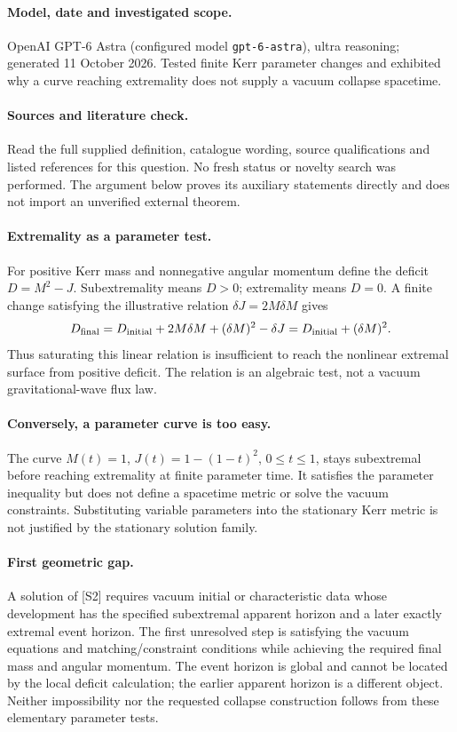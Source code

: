 \documentclass[11pt]{article}
\begin{document}
\paragraph{Model, date and investigated scope.}
OpenAI GPT-6 Astra (configured model \texttt{gpt-6-astra}), ultra reasoning; generated 11 October 2026. Tested finite Kerr parameter changes and exhibited why a curve reaching extremality does not supply a vacuum collapse spacetime.

\paragraph{Sources and literature check.}
Read the full supplied definition, catalogue wording, source qualifications and listed references for this question. No fresh status or novelty search was performed. The argument below proves its auxiliary statements directly and does not import an unverified external theorem.

\paragraph{Extremality as a parameter test.} For positive Kerr mass and nonnegative angular momentum define the deficit \(D=M^2-J\). Subextremality means \(D>0\); extremality means \(D=0\). A finite change satisfying the illustrative relation \(\delta J=2M\delta M\) gives
\[
 D_{\rm final}=D_{\rm initial}+2M\delta M+(\delta M)^2-\delta J
 =D_{\rm initial}+(\delta M)^2.
\]
Thus saturating this linear relation is insufficient to reach the nonlinear extremal surface from positive deficit. The relation is an algebraic test, not a vacuum gravitational-wave flux law.
\paragraph{Conversely, a parameter curve is too easy.} The curve \(M(t)=1\), \(J(t)=1-(1-t)^2\), \(0\leq t\leq1\), stays subextremal before reaching extremality at finite parameter time. It satisfies the parameter inequality but does not define a spacetime metric or solve the vacuum constraints. Substituting variable parameters into the stationary Kerr metric is not justified by the stationary solution family.
\paragraph{First geometric gap.} A solution of [S2] requires vacuum initial or characteristic data whose development has the specified subextremal apparent horizon and a later exactly extremal event horizon. The first unresolved step is satisfying the vacuum equations and matching/constraint conditions while achieving the required final mass and angular momentum. The event horizon is global and cannot be located by the local deficit calculation; the earlier apparent horizon is a different object. Neither impossibility nor the requested collapse construction follows from these elementary parameter tests.
\end{document}
